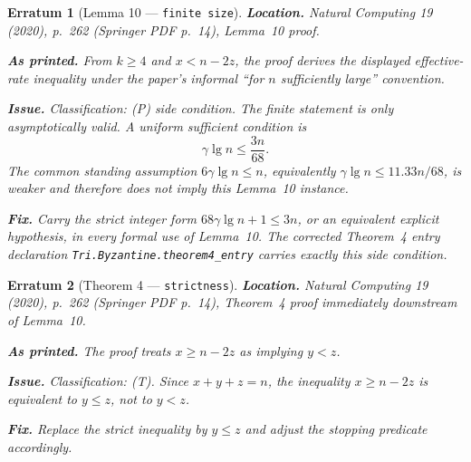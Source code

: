 \documentclass[11pt]{article}
\theoremstyle{erratumstyle}
\newtheorem{erratum}{Erratum}
\begin{document}
\begin{erratum}[Lemma 10 --- \texttt{finite size}]
\textbf{Location.} \emph{Natural Computing} 19 (2020), p.~262
(Springer PDF p.~14), Lemma~10 proof.

\medskip
\textbf{As printed.} From $k\ge4$ and $x<n-2z$, the proof derives the displayed
effective-rate inequality under the paper's informal ``for $n$ sufficiently
large'' convention.

\medskip
\textbf{Issue.} Classification: (P) side condition. The finite statement is
only asymptotically valid. A uniform sufficient condition is
\[
  \gamma\lg n \le \frac{3n}{68}.
\]
The common standing assumption $6\gamma\lg n\le n$, equivalently
$\gamma\lg n\le 11.33n/68$, is weaker and therefore does not imply this
Lemma~10 instance.

\medskip
\textbf{Fix.} Carry the strict integer form
$68\gamma\lg n+1\le 3n$, or an equivalent explicit hypothesis, in every
formal use of Lemma~10. The corrected Theorem~4 entry declaration
\texttt{Tri.Byzantine.theorem4\_entry} carries exactly this side condition.
\end{erratum}

\begin{erratum}[Theorem 4 --- \texttt{strictness}]
\textbf{Location.} \emph{Natural Computing} 19 (2020), p.~262
(Springer PDF p.~14), Theorem~4 proof immediately downstream of Lemma~10.

\medskip
\textbf{As printed.} The proof treats $x\ge n-2z$ as implying $y<z$.

\medskip
\textbf{Issue.} Classification: (T). Since $x+y+z=n$, the inequality
$x\ge n-2z$ is equivalent to $y\le z$, not to $y<z$.

\medskip
\textbf{Fix.} Replace the strict inequality by $y\le z$ and adjust the
stopping predicate accordingly.
\end{erratum}
\end{document}
